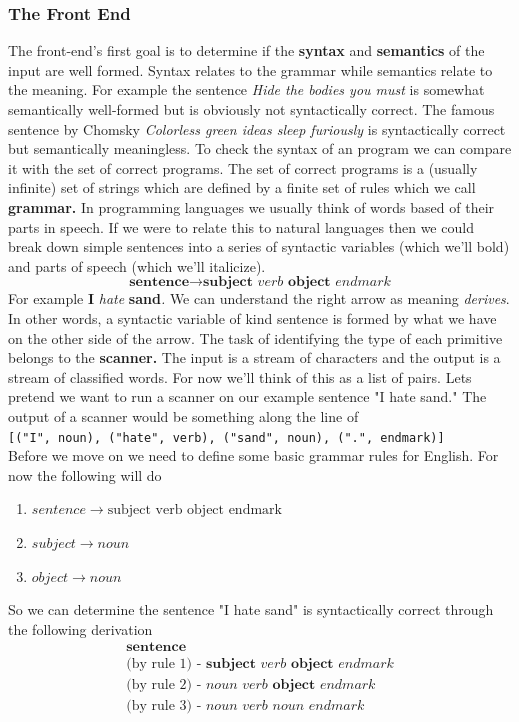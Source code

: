 \documentclass{article}
\begin{document}
\subsubsection{The Front End}
The front-end's first goal is to determine if the \textbf{syntax} and \textbf{semantics} of the input are well formed. Syntax relates to the grammar while semantics relate to the meaning. For example the sentence \textit{Hide the bodies you must} is somewhat semantically well-formed but is obviously not syntactically correct. The famous sentence by Chomsky \textit{Colorless green ideas sleep furiously} is syntactically correct but semantically meaningless. To check the syntax of an program we can compare it with the set of correct programs. The set of correct programs is a (usually infinite) set of strings which are defined by a finite set of rules which we call \textbf{grammar.} In programming languages we usually think of words based of their parts in speech. If we were to relate this to natural languages then we could break down simple sentences into a series of syntactic variables (which we'll bold) and parts of speech (which we'll italicize). 
$$\textbf{sentence}\rightarrow\textbf{subject}\textit{ verb}\textbf{ object}\textit{ endmark}$$
For example \textbf{I }\textit{hate }\textbf{sand}\textit{.} We can understand the right arrow as meaning \textit{derives}. In other words, a syntactic variable of kind sentence is formed by what we have on the other side of the arrow. The task of identifying the type of each primitive belongs to the \textbf{scanner.} The input is a stream of characters and the output is a stream of classified words. For now we'll think of this as a list of pairs. Lets pretend we want to run a scanner on our example sentence "I hate sand." The output of a scanner would be something along the line of \\\texttt{[("I", noun), ("hate", verb), ("sand", noun), (".", endmark)]}\\
Before we move on we need to define some basic grammar rules for English. For now the following will do
\begin{enumerate}
  \item $sentence\rightarrow \text{subject verb object endmark}$
  \item $subject\rightarrow noun$
  \item $object \rightarrow noun$
\end{enumerate}
So we can determine the sentence "I hate sand" is syntactically correct through the following derivation
\begin{align*}
  \textbf{sentence}\\
  \text{(by rule 1) - } \textbf{subject } \textit{verb } \textbf{object } \textit{endmark}\\
  \text{(by rule 2) - } \textit{noun } \textit{verb } \textbf{object } \textit{endmark}\\
  \text{(by rule 3) - } \textit{noun } \textit{verb } \textit{noun } \textit{endmark}\\
\end{align*}
\end{document}
